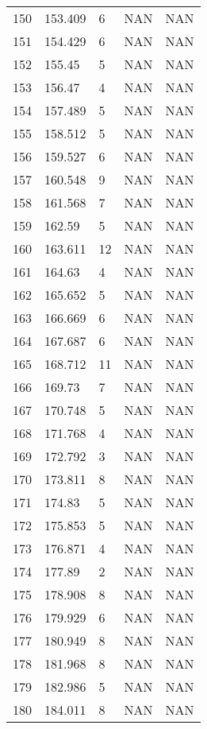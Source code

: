 \documentclass{article}
\begin{document}
\begin{longtable}{@{}lllll@{}}
				150 & 153.409 & 6     & NAN   & NAN   \\
				151 & 154.429 & 6     & NAN   & NAN   \\
				152 & 155.45  & 5     & NAN   & NAN   \\
				153 & 156.47  & 4     & NAN   & NAN   \\
				154 & 157.489 & 5     & NAN   & NAN   \\
				155 & 158.512 & 5     & NAN   & NAN   \\
				156 & 159.527 & 6     & NAN   & NAN   \\
				157 & 160.548 & 9     & NAN   & NAN   \\
				158 & 161.568 & 7     & NAN   & NAN   \\
				159 & 162.59  & 5     & NAN   & NAN   \\
				160 & 163.611 & 12    & NAN   & NAN   \\
				161 & 164.63  & 4     & NAN   & NAN   \\
				162 & 165.652 & 5     & NAN   & NAN   \\
				163 & 166.669 & 6     & NAN   & NAN   \\
				164 & 167.687 & 6     & NAN   & NAN   \\
				165 & 168.712 & 11    & NAN   & NAN   \\
				166 & 169.73  & 7     & NAN   & NAN   \\
				167 & 170.748 & 5     & NAN   & NAN   \\
				168 & 171.768 & 4     & NAN   & NAN   \\
				169 & 172.792 & 3     & NAN   & NAN   \\
				170 & 173.811 & 8     & NAN   & NAN   \\
				171 & 174.83  & 5     & NAN   & NAN   \\
				172 & 175.853 & 5     & NAN   & NAN   \\
				173 & 176.871 & 4     & NAN   & NAN   \\
				174 & 177.89  & 2     & NAN   & NAN   \\
				175 & 178.908 & 8     & NAN   & NAN   \\
				176 & 179.929 & 6     & NAN   & NAN   \\
				177 & 180.949 & 8     & NAN   & NAN   \\
				178 & 181.968 & 8     & NAN   & NAN   \\
				179 & 182.986 & 5     & NAN   & NAN   \\
				180 & 184.011 & 8     & NAN   & NAN   \\

\end{longtable}
\end{document}
